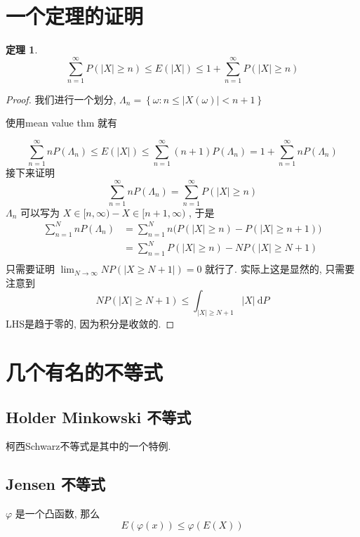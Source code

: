 \documentclass[a4paper, 10pt]{ctexart} %
\newtheorem{theorem}{定理}
\begin{document}
    \section{一个定理的证明}
    \begin{theorem}
        \[
        \sum_{n=1} ^{\infty} P\left(\left| X \right|  \ge n \right) \le E \left( \left| X \right| \right) \le 1 + \sum_{n=1} ^{\infty} P\left(\left| X \right|  \ge n\right)
        \]
    \end{theorem}
    \begin{proof}
        我们进行一个划分, $\Lambda _{n} = \left\{\omega : n \le | X \left( \omega\right)| < n+1\right\}$

        使用mean value thm 就有

        \[
        \sum_{n=1} ^{\infty} n P\left( \Lambda _{n}\right) \le E (\left| X \right| ) \le \sum_{n=1} ^{\infty} \left(n +1\right) P( \Lambda _{n}) = 1 + \sum_{n=1} ^{\infty} n P(\Lambda_{n})
        \]
        接下来证明 
        \[
        \sum_{n=1} ^{\infty} n P\left(\Lambda_{n}\right) = \sum_{n=1} ^{\infty} P\left( \left| X \right|  \ge n\right)
        \]
        $\Lambda_{n}$ 可以写为 $ X \in [n, \infty) - X \in [n+1 , \infty )$ , 于是
        \[
        \begin{aligned}
            \sum_{n=1} ^{N}n P \left(\Lambda _{n}\right) & = \sum_{n=1} ^{N} n \Big(P (\left| X \right|  \ge n)  - P\left(\left| X \right|  \ge n+1   \right) \Big)\\
            & = \sum_{n=1} ^{N}  P (\left| X \right| \ge n) - N P (\left| X \right|  \ge N+1  )\\
        \end{aligned}
        \]
        只需要证明 $\displaystyle \lim_{N \to \infty} N P(\left| X\ge N +1 \right| ) = 0$ 就行了. 
        实际上这是显然的, 只需要注意到 
        \[
        N P \left( \left| X \right|  \ge N + 1 \right) \le \int _{\left| X \right| \ge N +1} \left|X \right|  \ \mathrm{d}P 
        \]
        LHS是趋于零的, 因为积分是收敛的. 
    \end{proof}
    \section{几个有名的不等式}
    \subsection{Holder Minkowski 不等式}
    柯西Schwarz不等式是其中的一个特例.
    \subsection{Jensen 不等式}
    $\varphi$ 是一个凸函数, 那么 
    \[
    E \left( \varphi \left(x\right)\right) \le \varphi ( E (X))
    \]
\end{document}
